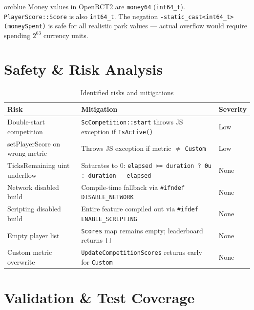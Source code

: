 \documentclass[12pt,a4paper]{article}
\begin{document}
\begin{calloutbox}[title={Why not use \texttt{int32\_t} overflow risk for MoneyEarned?}]{orcblue}
Money values in OpenRCT2 are \texttt{money64} (\texttt{int64\_t}). \texttt{PlayerScore::Score} is also
\texttt{int64\_t}. The negation \texttt{-static\_cast<int64\_t>(moneySpent)} is safe for all realistic
park values --- actual overflow would require spending $2^{63}$ currency units.
\end{calloutbox}

\section{Safety \& Risk Analysis}

\begin{table}[h!]
\centering
\begin{tabularx}{\linewidth}{lXl}
\toprule
\textbf{Risk} & \textbf{Mitigation} & \textbf{Severity} \\
\midrule
Double-start competition & \texttt{ScCompetition::start} throws JS exception if \texttt{IsActive()} & Low \\
setPlayerScore on wrong metric & Throws JS exception if metric $\neq$ \texttt{Custom} & Low \\
TicksRemaining uint underflow & Saturates to 0: \texttt{elapsed >= duration ? 0u : duration - elapsed} & None \\
Network disabled build & Compile-time fallback via \texttt{\#ifndef DISABLE\_NETWORK} & None \\
Scripting disabled build & Entire feature compiled out via \texttt{\#ifdef ENABLE\_SCRIPTING} & None \\
Empty player list & \texttt{Scores} map remains empty; leaderboard returns \texttt{[]} & None \\
Custom metric overwrite & \texttt{UpdateCompetitionScores} returns early for \texttt{Custom} & None \\
\bottomrule
\end{tabularx}
\caption{Identified risks and mitigations}
\end{table}

\section{Validation \& Test Coverage}
\end{document}
